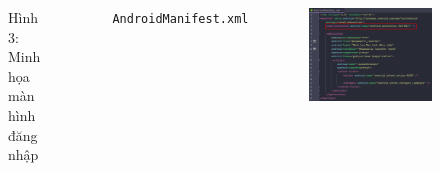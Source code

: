 \documentclass{beamer}
\begin{document}
\begin{frame}
\begin{columns}
\begin{figure}
            \caption{\centering\tiny{Hình 3: Minh họa màn hình đăng nhập}}
        \end{figure}
        \indent \texttt{AndroidManifest.xml}
        \begin{figure}
            \centering
            \includegraphics[width=\textwidth]{images/26.png}
        \end{figure}
    \end{columns}
\end{frame}
\end{document}
